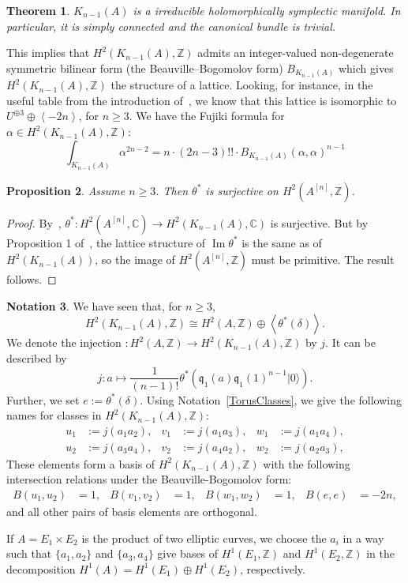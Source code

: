 \documentclass{alggeom}
\DeclareMathOperator{\im}{Im}
\newcommand{\hilb}[1]{^{[#1]}}
\newcommand{\vac}{|0\rangle}
\newcommand{\q}{\mathfrak{q}}
\newcommand{\kum}[2]{K_{ #2 }( #1 )}
\newcommand{\C}{\mathbb{C}}
\newcommand{\Z}{\mathbb{Z}}
\theoremstyle{plain}
\newtheorem{theorem}{Theorem}[section]
\newtheorem{proposition}[theorem]{Proposition}
\theoremstyle{definition}
\newtheorem{notation}[theorem]{Notation}
\theoremstyle{remark}
\begin{document}
\begin{theorem}\cite[Th\'eor\`eme 4]{Beauville}
$\kum{A}{n-1}$ is a irreducible holomorphically symplectic manifold. In particular, it is simply connected and the canonical bundle is trivial.
\end{theorem}
This implies that $H^2(\kum{A}{n-1},\Z)$ admits an integer-valued non-degenerate symmetric bilinear form (the Beauville--Bogomolov form) $B_{\kum{A}{n-1}}$ which gives $H^2(\kum{A}{n-1},\Z)$ the structure of a lattice. Looking, for instance, in the useful table from the introduction of~\cite{Rapagnetta}, we know that this lattice is
isomorphic to $U^{\oplus 3}\oplus \left< -2n \right>$, for $n\geq 3$. 
We have the Fujiki formula for $\alpha\in H^2(\kum{A}{n-1},\Z)$:
\begin{equation} \label{fujiki}
\int_{\kum{A}{n-1}} \alpha^{2n-2} = n\cdot(2n-3)!!\cdot B_{\kum{A}{n-1}}(\alpha,\alpha)^{n-1}
\end{equation}

\begin{proposition}\label{H2Sur} Assume $n\geq 3$. Then
$\theta^*$ is surjective on $H^2(A\hilb{n},\Z)$.
\end{proposition}
\begin{proof}
By~\cite[Sect.~7]{Beauville}, $\theta^{\ast} : H^2(A\hilb{n},\C) \rightarrow H^2(\kum{A}{n-1},\C)$ is surjective. 
But by Proposition 1 of~\cite{Britze}, the lattice structure of $\im \theta^*$ is the same as of $H^2(\kum{A}{n-1})$, so the image of $H^2(A\hilb{n},\Z)$ must be primitive. The result follows.
\end{proof}
\begin{notation}\label{BasisH2KA}
 We have seen that, for $n\geq 3$,
 $$
 H^2(\kum{A}{n-1},\Z) \cong H^2(A,\Z) \oplus\left<\theta^*(\delta)\right>.
 $$
We denote the injection $ : H^2(A,\Z) \rightarrow H^2(\kum{A}{n-1},\Z)$ by $j$. It can be described by 
$$
j : a \longmapsto \frac{1}{(n-1)!}\theta^*\left(\q_1(a)\q_1(1)^{n-1}\vac\right).
$$ 
Further, we set $e:=\theta^*(\delta)$. Using Notation~\ref{TorusClasses}, we give the following names for classes in $H^2(\kum{A}{n-1},\Z)$:
\begin{align*}
u_1 &:= j(a_1 a_2), & v_1 &:= j(a_1 a_3), & w_1 &:= j(a_1 a_4), \\ 
u_2 &:= j(a_3 a_4), & v_2 &:= j(a_4 a_2), & w_2 &:= j(a_2 a_3),
\end{align*}
These elements form a basis of $H^2(\kum{A}{n-1},\Z)$ with the following intersection relations under the Beauville-Bogomolov form:
\begin{align*}
B(u_1,u_2) &= 1, & B(v_1,v_2) &= 1, & B(w_1,w_2) &= 1,  &
B(e,e)&= -2n,
\end{align*}
and all other pairs of basis elements are orthogonal.

If $A=E_1\times E_2$ is the product of two elliptic curves, we choose the $a_i$ in a way such that $\{a_1,a_2\}$ 
and $\{a_3,a_4\}$ give bases of $H^1(E_1,\Z)$ and $H^1(E_2,\Z)$ in the decomposition $H^1(A) = H^1(E_1)\oplus H^1(E_2)$, respectively.
\end{notation}
\end{document}
